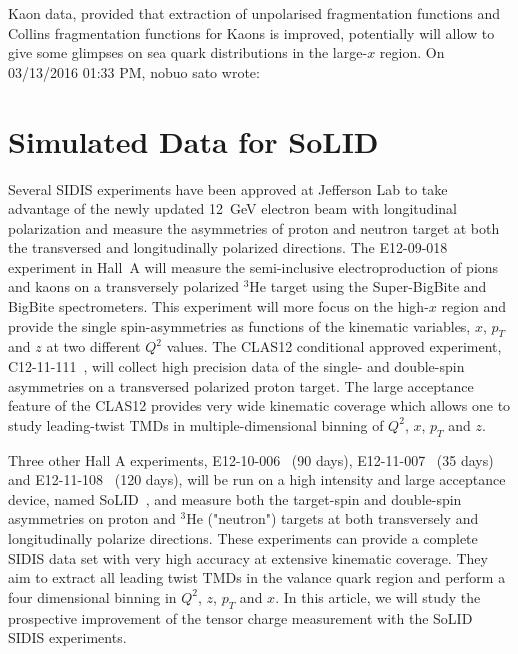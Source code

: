\documentclass[twocolumn,showpacs,preprintnumbers,amsmath,amssymb,floatfix,prd]{revtex4}
\begin{document}
Kaon data, provided that extraction of unpolarised fragmentation functions and Collins fragmentation functions for Kaons is improved, potentially will allow to give some glimpses on sea quark distributions in the large-$x$ region.
On 03/13/2016 01:33 PM, nobuo sato wrote:


\section{Simulated Data for SoLID}
%
Several SIDIS experiments have been approved at Jefferson Lab to take advantage of the newly updated 12~GeV electron beam with longitudinal polarization and measure the asymmetries of proton and neutron target at both the transversed and longitudinally polarized directions. The  E12-09-018 experiment in Hall~A \cite{e1209018} will measure the semi-inclusive electroproduction of pions and kaons on a transversely polarized $\mathrm{^{3}He}$ target using the Super-BigBite and BigBite spectrometers. This experiment will more focus on the high-$x$ region and provide the single spin-asymmetries as functions of the kinematic variables, $x$, $p_{T}$ and $z$ at two different $Q^{2}$ values.   The CLAS12 conditional approved experiment, C12-11-111~\cite{c1211111}, will collect high precision data of the single- and double-spin asymmetries on a transversed polarized proton target. The large acceptance feature of the CLAS12 provides very wide  kinematic coverage which allows one to study  leading-twist TMDs in multiple-dimensional binning of $Q^{2}$, $x$, $p_{T}$ and $z$.

Three other Hall A experiments, E12-10-006~\cite{1210006} (90 days), E12-11-007~\cite{e1211007} (35 days) and E12-11-108~\cite{e1211108} (120 days), will be run on a high intensity and large acceptance device, named SoLID~\cite{solid_pcdr}, and measure both the target-spin and double-spin asymmetries on proton and  $\mathrm{^{3}He}$ ("neutron") targets at both  transversely and longitudinally polarize directions. These experiments can provide a complete SIDIS data set with very high accuracy at extensive kinematic coverage. They aim to extract all leading twist TMDs in the valance quark region and perform a  four dimensional binning in $Q^{2}$, $z$, $p_{T}$ and $x$. In this article, we will study the prospective improvement of the tensor charge measurement  with the SoLID SIDIS experiments. 
\end{document}
